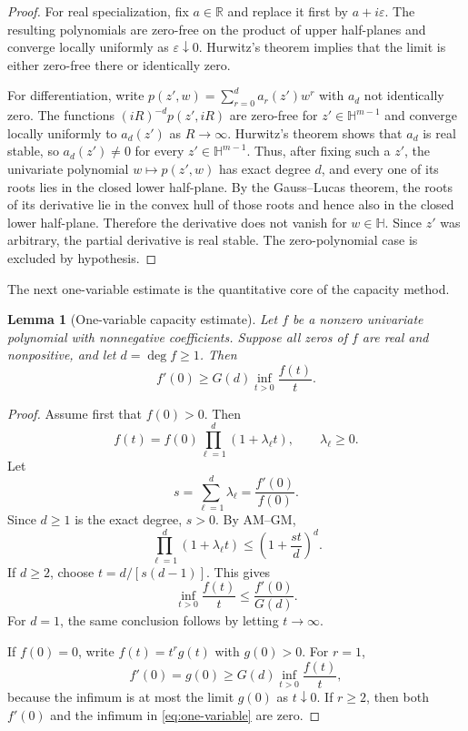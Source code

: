\documentclass[11pt]{article}
\newtheorem{lemma}[theorem]{Lemma}
\theoremstyle{definition}
\newcommand{\1}{\mathbf{1}}
\newcommand{\cH}{\mathbb{H}}
\newcommand{\eps}{\varepsilon}
\begin{document}
\begin{proof}
For real specialization, fix $a\in\mathbb R$ and replace it first by $a+i\eps$.  The resulting polynomials are zero-free on the product of upper half-planes and converge locally uniformly as $\eps\downarrow0$.  Hurwitz's theorem implies that the limit is either zero-free there or identically zero.

For differentiation, write $p(z',w)=\sum_{r=0}^d a_r(z')w^r$ with $a_d$ not identically zero.  The functions $(iR)^{-d}p(z',iR)$ are zero-free for $z'\in\cH^{m-1}$ and converge locally uniformly to $a_d(z')$ as $R\to\infty$.  Hurwitz's theorem shows that $a_d$ is real stable, so $a_d(z')\ne0$ for every $z'\in\cH^{m-1}$.  Thus, after fixing such a $z'$, the univariate polynomial $w\mapsto p(z',w)$ has exact degree $d$, and every one of its roots lies in the closed lower half-plane.  By the Gauss--Lucas theorem, the roots of its derivative lie in the convex hull of those roots and hence also in the closed lower half-plane.  Therefore the derivative does not vanish for $w\in\cH$.  Since $z'$ was arbitrary, the partial derivative is real stable.  The zero-polynomial case is excluded by hypothesis.
\end{proof}

The next one-variable estimate is the quantitative core of the capacity method.

\begin{lemma}[One-variable capacity estimate]\label{lem:one-variable}
Let $f$ be a nonzero univariate polynomial with nonnegative coefficients.  Suppose all zeros of $f$ are real and nonpositive, and let $d=\deg f\ge1$.  Then
\[
 f'(0)\ge G(d)\inf_{t>0}\frac{f(t)}t.
 \tag{3.2}\label{eq:one-variable}
\]
\end{lemma}

\begin{proof}
Assume first that $f(0)>0$.  Then
\[
 f(t)=f(0)\prod_{\ell=1}^d(1+\lambda_\ell t),
 \qquad \lambda_\ell\ge0.
\]
Let
\[
 s=\sum_{\ell=1}^d\lambda_\ell=\frac{f'(0)}{f(0)}.
\]
Since $d\ge1$ is the exact degree, $s>0$.  By AM--GM,
\[
 \prod_{\ell=1}^d(1+\lambda_\ell t)
 \le \left(1+\frac{st}{d}\right)^d.
\]
If $d\ge2$, choose $t=d/[s(d-1)]$.  This gives
\[
 \inf_{t>0}\frac{f(t)}t
 \le \frac{f'(0)}{G(d)}.
\]
For $d=1$, the same conclusion follows by letting $t\to\infty$.

If $f(0)=0$, write $f(t)=t^r g(t)$ with $g(0)>0$.  For $r=1$,
\[
 f'(0)=g(0)\ge G(d)\inf_{t>0}\frac{f(t)}t,
\]
because the infimum is at most the limit $g(0)$ as $t\downarrow0$.  If $r\ge2$, then both $f'(0)$ and the infimum in \eqref{eq:one-variable} are zero.
\end{proof}
\end{document}
